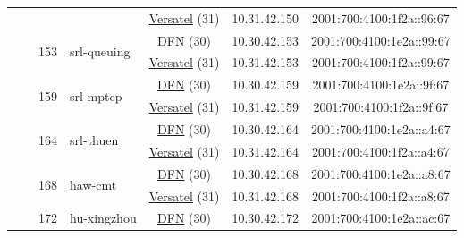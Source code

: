 \begin{small}
\begin{center}
\begin{longtable}{|c|c|c|c|c|c|c|c|}
  &  &  &  & \multicolumn{2}{|c|}{\tiny{\href{http://www.versatel.de}{Versatel} (31)}} & \tiny{10.31.42.150} & \tiny{2001:700:4100:1f2a::96:67} \\* \cline{3-3}\cline{4-4}\cline{5-5}\cline{6-6}\cline{7-7}\cline{8-8}
  &  & \multirow{2}{*}{\tiny{153}} & \multicolumn{1}{|l|}{\multirow{2}{*}{\tiny{srl-queuing}}} & \multicolumn{2}{|c|}{\tiny{\href{https://www.dfn.de}{DFN} (30)}} & \tiny{10.30.42.153} & \tiny{2001:700:4100:1e2a::99:67} \\* \cline{5-5}\cline{6-6}\cline{7-7}\cline{8-8}
  &  &  &  & \multicolumn{2}{|c|}{\tiny{\href{http://www.versatel.de}{Versatel} (31)}} & \tiny{10.31.42.153} & \tiny{2001:700:4100:1f2a::99:67} \\* \cline{3-3}\cline{4-4}\cline{5-5}\cline{6-6}\cline{7-7}\cline{8-8}
  &  & \multirow{2}{*}{\tiny{159}} & \multicolumn{1}{|l|}{\multirow{2}{*}{\tiny{srl-mptcp}}} & \multicolumn{2}{|c|}{\tiny{\href{https://www.dfn.de}{DFN} (30)}} & \tiny{10.30.42.159} & \tiny{2001:700:4100:1e2a::9f:67} \\* \cline{5-5}\cline{6-6}\cline{7-7}\cline{8-8}
  &  &  &  & \multicolumn{2}{|c|}{\tiny{\href{http://www.versatel.de}{Versatel} (31)}} & \tiny{10.31.42.159} & \tiny{2001:700:4100:1f2a::9f:67} \\* \cline{3-3}\cline{4-4}\cline{5-5}\cline{6-6}\cline{7-7}\cline{8-8}
  &  & \multirow{2}{*}{\tiny{164}} & \multicolumn{1}{|l|}{\multirow{2}{*}{\tiny{srl-thuen}}} & \multicolumn{2}{|c|}{\tiny{\href{https://www.dfn.de}{DFN} (30)}} & \tiny{10.30.42.164} & \tiny{2001:700:4100:1e2a::a4:67} \\* \cline{5-5}\cline{6-6}\cline{7-7}\cline{8-8}
  &  &  &  & \multicolumn{2}{|c|}{\tiny{\href{http://www.versatel.de}{Versatel} (31)}} & \tiny{10.31.42.164} & \tiny{2001:700:4100:1f2a::a4:67} \\* \cline{3-3}\cline{4-4}\cline{5-5}\cline{6-6}\cline{7-7}\cline{8-8}
  &  & \multirow{2}{*}{\tiny{168}} & \multicolumn{1}{|l|}{\multirow{2}{*}{\tiny{haw-cmt}}} & \multicolumn{2}{|c|}{\tiny{\href{https://www.dfn.de}{DFN} (30)}} & \tiny{10.30.42.168} & \tiny{2001:700:4100:1e2a::a8:67} \\* \cline{5-5}\cline{6-6}\cline{7-7}\cline{8-8}
  &  &  &  & \multicolumn{2}{|c|}{\tiny{\href{http://www.versatel.de}{Versatel} (31)}} & \tiny{10.31.42.168} & \tiny{2001:700:4100:1f2a::a8:67} \\* \cline{3-3}\cline{4-4}\cline{5-5}\cline{6-6}\cline{7-7}\cline{8-8}
  &  & \multirow{2}{*}{\tiny{172}} & \multicolumn{1}{|l|}{\multirow{2}{*}{\tiny{hu-xingzhou}}} & \multicolumn{2}{|c|}{\tiny{\href{https://www.dfn.de}{DFN} (30)}} & \tiny{10.30.42.172} & \tiny{2001:700:4100:1e2a::ac:67} \\* \cline{5-5}\cline{6-6}\cline{7-7}\cline{8-8}

\end{longtable}
\end{center}
\end{small}
